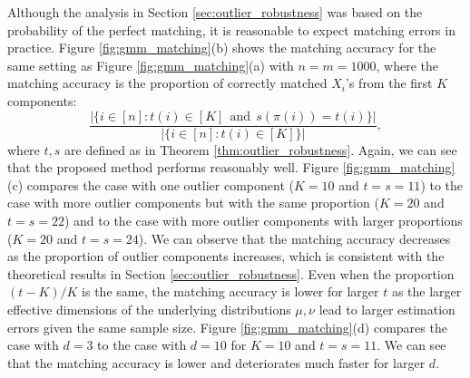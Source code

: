 \documentclass[11pt,letterpaper]{article}
\theoremstyle{definition}
\numberwithin{equation}{section}
\begin{document}
Although the analysis in Section \ref{sec:outlier_robustness} was based on the probability of the perfect matching, it is reasonable to expect matching errors in practice. Figure \ref{fig:gmm_matching}(b) shows the matching accuracy for the same setting as Figure \ref{fig:gmm_matching}(a) with $n = m = 1000$, where the matching accuracy is the proportion of correctly matched $X_i$'s from the first $K$ components:
\begin{equation}
    \label{eq:mixture_matching_accuracy}
    \frac{|\{i \in [n] : t(i) \in [K] ~~ \text{and} ~~ s(\pi(i)) = t(i)\}|}{|\{i \in [n] : t(i) \in [K]\}|},
\end{equation}
where $t, s$ are defined as in Theorem \ref{thm:outlier_robustness}. Again, we can see that the proposed method performs reasonably well. Figure \ref{fig:gmm_matching}(c) compares the case with one outlier component ($K = 10$ and $t = s = 11$) to the case with more outlier components but with the same proportion ($K = 20$ and $t = s = 22$) and to the case with more outlier components with larger proportions ($K = 20$ and $t = s = 24$). We can observe that the matching accuracy decreases as the proportion of outlier components increases, which is consistent with the theoretical results in Section \ref{sec:outlier_robustness}. Even when the proportion $(t - K) / K$ is the same, the matching accuracy is lower for larger $t$ as the larger effective dimensions of the underlying distributions $\mu, \nu$ lead to larger estimation errors given the same sample size. Figure \ref{fig:gmm_matching}(d) compares the case with $d = 3$ to the case with $d = 10$ for $K = 10$ and $t = s = 11$. We can see that the matching accuracy is lower and deteriorates much faster for larger $d$.
\end{document}
